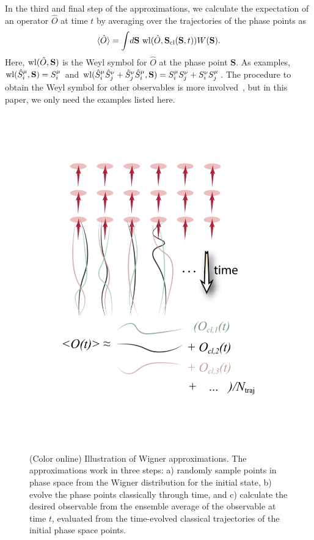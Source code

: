 \documentclass[pra,reprint,superscriptaddress]{revtex4-1}
\newcommand{\smallexpect}[1]{\langle #1 \rangle}
\newcommand{\hS}{\hat{S}}
\begin{document}
In the third and final step of the approximations, we calculate the expectation of an operator $\hat{O}$ at time $t$ by averaging over the trajectories of the phase points as
\begin{equation}\label{eqn: O}
\smallexpect{\hat{O}} = \int\! d\mathbf{S}~{\rm wl}(\hat{O},\mathbf{S}_{\rm cl}(\mathbf{S},t)) W(\mathbf{S}).
\end{equation}
Here, ${\rm wl}(\hat{O},\mathbf{S})$ is the Weyl symbol for $\hat{O}$ at the phase point $\mathbf{S}$. As examples, ${\rm wl}(\hS^\mu_i,\mathbf{S}) = S^\mu_i$ and ${\rm wl}(\hS^\mu_i\hS^\nu_j+\hS^\nu_j\hS^\mu_i,\mathbf{S}) = S^\mu_iS^\nu_j+S^\nu_iS^\mu_j$. The procedure to obtain the Weyl symbol for other observables is more involved~\cite{polkovnikov2010phase}, but in this paper, we only need the examples listed here.

\begin{figure}[t]\centering
 \includegraphics[width = 0.7\columnwidth]{wigner2.pdf}
 \caption{(Color online) Illustration of Wigner approximations. The approximations work in three steps: a) randomly sample points in phase space from the Wigner distribution for the initial state, b) evolve the phase points classically through time, and c) calculate the desired observable from the ensemble average of the observable at time $t$, evaluated from the time-evolved classical trajectories of the initial phase space points.}
 \label{fig: wigner2}
\end{figure}
\end{document}
